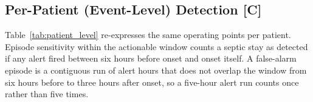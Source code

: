 \subsection{Per-Patient (Event-Level) Detection \texorpdfstring{[C]}{[C]}}

Table~\ref{tab:patient_level} re-expresses the same operating points per
patient. Episode sensitivity within the actionable window counts a septic stay
as detected if any alert fired between six hours before onset and onset
itself. A false-alarm episode is a contiguous run of alert hours that does not
overlap the window from six hours before to three hours after onset, so a
five-hour alert run counts once rather than five times.

\begin{table}[H]
    \centering\small
\end{table}
